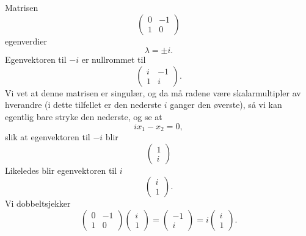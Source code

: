 \begin{ex}
Matrisen
\[
\begin{pmatrix}
0 & -1 \\ 1 &0
\end{pmatrix}
\]
egenverdier
\[
\lambda=\pm i.
\] 
Egenvektoren til $-i$ er nullrommet til 
\[
\begin{pmatrix}
i & -1 \\ 1 &i
\end{pmatrix}.
\]
Vi vet at denne matrisen er singulær, 
og da må radene være skalarmultipler av hverandre (i dette tilfellet er den nederste $i$ ganger den øverste), 
så vi kan egentlig bare stryke den nederste, og se at
\[
ix_1-x_2=0,
\]
slik at egenvektoren til $-i$ blir
\[
\begin{pmatrix}
1  \\ i
\end{pmatrix}
\]
Likeledes blir egenvektoren til $i$ 
\[
\begin{pmatrix}
i  \\ 1
\end{pmatrix}.
\]
Vi dobbeltsjekker
\[
\begin{pmatrix}
0 & -1 \\ 1 &0
\end{pmatrix}
\begin{pmatrix}
i  \\ 1
\end{pmatrix}
=
\begin{pmatrix}
-1  \\ i
\end{pmatrix}
=
i
\begin{pmatrix}
i  \\ 1
\end{pmatrix}.
\]
\end{ex}


